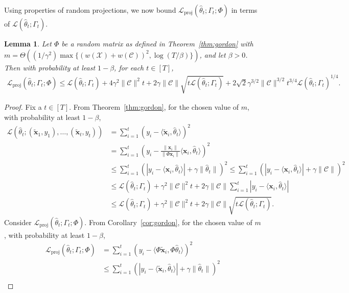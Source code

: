 \documentclass{article}
\theoremstyle{plain}
\newtheorem{lemma}[theorem]{Lemma}
\def \CCC {\mathcal{C}}
\def \XXX {\mathcal{X}}
\def \LLL {\mathcal{L}}
\def \proj {{\mathrm{proj}}}
\def \x {\mathbf x}
\begin{document}
Using properties of random projections, we now bound $\LLL_\proj(\hat{\theta}_t;\Gamma_t;\Phi)$ in terms of $\LLL(\hat{\theta}_t;\Gamma_t)$.
\begin{lemma} \label{lem:JLfirst}
Let $\Phi$ be a random matrix as defined in Theorem~\ref{thm:gordon} with $m = \Theta((1/\gamma^2)\max\{(w(\XXX)+w(\CCC))^2,\log(T/\beta)\})$, and let $\beta > 0$. Then with probability at least $1-\beta$, for each $t \in [T]$,
\begin{align*}
\LLL_\proj(\hat{\theta}_t;\Gamma_t;\Phi) \leq \LLL(\hat{\theta}_t;\Gamma_t) + 4 \gamma^{2} \| \CCC \|^{2} t + 2\gamma \| \CCC \| \sqrt{t \LLL(\hat{\theta}_t;\Gamma_t)}+ 2\sqrt{2}\gamma^{3/2} \| \CCC \|^{3/2}t^{3/4}\LLL(\hat{\theta}_t;\Gamma_t)^{1/4}.
\end{align*}
\end{lemma}
\begin{proof}
Fix a $t \in [T]$. From Theorem~\ref{thm:gordon}, for the chosen value of $m$, with probability at least $1-\beta$,
\begin{align} \label{eqn:JLfirst}
\LLL(\hat{\theta}_t;(\tilde{\x}_1,y_1),\dots,(\tilde{\x}_t,y_t)) & =\sum_{i=1}^t (y_i - \langle  \tilde{\x}_i, \hat{\theta}_t \rangle)^2 \nonumber \\
& = \sum_{i=1}^t  \left (y_i - \frac{\| \x_i\|}{\| \Phi \x_i \|} \langle  \x_i, \hat{\theta}_t \rangle \right )^2  \nonumber\\
& \leq \sum_{i=1}^t (|y_i - \langle  \x_i, \hat{\theta}_t \rangle| + \gamma \| \hat{\theta}_t \|)^2  \leq \sum_{i=1}^t (|y_i - \langle  \x_i, \hat{\theta}_t \rangle| + \gamma \| \CCC \|)^2 \nonumber\\
& \leq \LLL(\hat{\theta}_t;\Gamma_t) + \gamma^{2} \| \CCC \|^{2} t + 2\gamma \| \CCC \| \sum_{i=1}^t |y_i - \langle \x_i, \hat{\theta}_t \rangle| \nonumber\\
& \leq \LLL(\hat{\theta}_t;\Gamma_t) + \gamma^{2} \| \CCC \|^{2} t + 2\gamma \| \CCC \| \sqrt{t \LLL(\hat{\theta}_t;\Gamma_t)}.
\end{align}
Consider $\LLL_\proj(\hat{\theta}_t;\Gamma_t;\Phi)$. From Corollary~\ref{cor:gordon}, for the chosen value of $m$, with probability at least $1-\beta$,
\begin{align*}
\LLL_\proj(\hat{\theta}_t;\Gamma_t;\Phi) & = \sum_{i=1}^t (y_i - \langle  \Phi \tilde{\x}_i, \Phi \hat{\theta}_t \rangle )^2  \\
& \leq \sum_{i=1}^t (|y_i - \langle \tilde{\x}_i, \hat{\theta}_t \rangle| + \gamma \| \hat{\theta}_t \|)^2 \\

\end{align*}
\end{proof}
\end{document}
